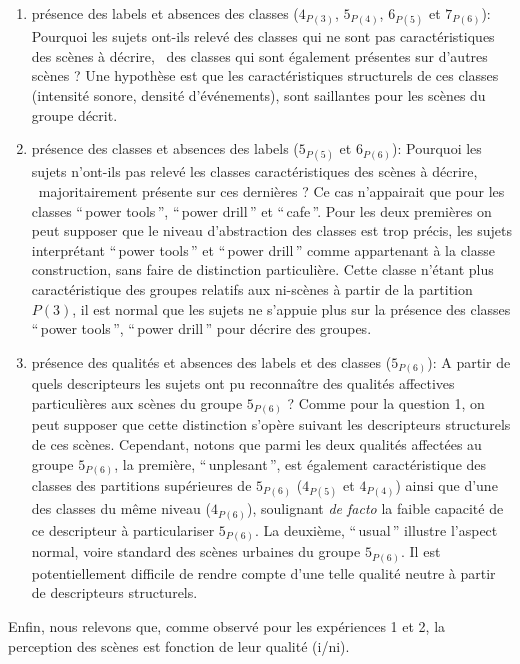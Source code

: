 \begin{enumerate}
\item présence des labels et absences des classes ($4_{P(3)}$, $5_{P(4)}$, $6_{P(5)}$ et $7_{P(6)}$): Pourquoi les sujets ont-ils relevé des classes qui ne sont pas caractéristiques des scènes à décrire, \ie~des classes qui sont également présentes sur d'autres scènes ? Une hypothèse est que les caractéristiques structurels de ces classes (intensité sonore, densité d'événements), sont saillantes pour les scènes du groupe décrit.
\item présence des classes et absences des labels ($5_{P(5)}$ et $6_{P(6)}$): Pourquoi les sujets n'ont-ils pas relevé les classes caractéristiques des scènes à décrire, \ie~majoritairement présente sur ces dernières ? Ce cas n’appairait que pour les classes ``\,power tools\,'', ``\,power drill\,'' et  ``\,cafe\,''. Pour les deux premières on peut supposer que le niveau d'abstraction des classes est trop précis, les sujets interprétant ``\,power tools\,'' et ``\,power drill\,'' comme appartenant à la classe construction, sans faire de distinction particulière. Cette classe n'étant plus caractéristique des groupes relatifs aux ni-scènes à partir de la partition $P(3)$, il est normal que les sujets ne s'appuie plus sur la présence des classes ``\,power tools\,'', ``\,power drill\,'' pour décrire des groupes.
\item présence des qualités et absences des labels et des classes ($5_{P(6)}$): A partir de quels descripteurs les sujets ont pu reconnaître des qualités affectives particulières aux scènes du groupe $5_{P(6)}$ ? Comme pour la question 1, on peut supposer que cette distinction s'opère suivant les descripteurs structurels de ces scènes. Cependant, notons que parmi les deux qualités affectées au groupe $5_{P(6)}$, la première, ``\,unplesant\,'', est également caractéristique des classes des partitions supérieures de $5_{P(6)}$ ($4_{P(5)}$ et $4_{P(4)}$) ainsi que d'une des classes du même niveau ($4_{P(6)}$), soulignant \emph{de facto} la faible capacité de ce descripteur à particulariser $5_{P(6)}$. La deuxième, ``\,usual\,'' illustre l'aspect normal, voire standard des scènes urbaines du groupe $5_{P(6)}$. Il est potentiellement difficile de rendre compte d'une telle qualité neutre à partir de descripteurs structurels.
\end{enumerate}

Enfin, nous relevons que, comme observé pour les expériences 1 et 2, la perception des scènes est fonction de leur qualité (i/ni).

